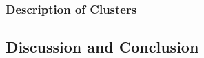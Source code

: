 \documentclass{article}
\begin{document}
\subsubsection{Description of Clusters}




\subsection{Discussion and Conclusion}


\end{document}
